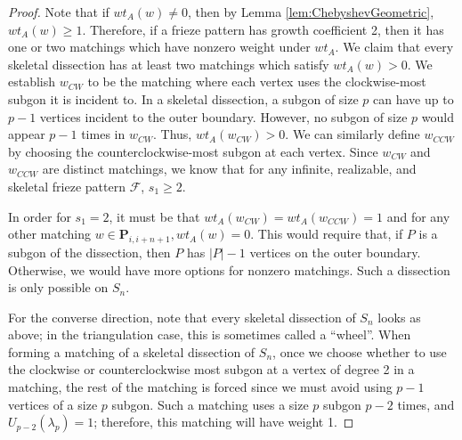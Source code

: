 \documentclass[12pt]{article}
\theoremstyle{remark}
\newcommand*{\pathset}[2]{\mathbf{P}_{#1,#2}}
\begin{document}
\begin{proof}
Note that if $wt_A(w) \neq 0$, then by Lemma \ref{lem:ChebyshevGeometric}, $wt_A(w) \geq 1$. Therefore, if a frieze pattern has growth coefficient 2, then it has one or two matchings which have nonzero weight under $wt_A$. We claim that every skeletal dissection has at least two matchings which satisfy $wt_A(w) > 0$. We establish $w_{CW}$ to be the matching where each vertex uses the clockwise-most subgon it is incident to. In a skeletal dissection, a subgon of size $p$ can have up to $p-1$ vertices incident to the outer boundary. However, no subgon of size $p$ would appear $p-1$ times in $w_{CW}$. Thus, $wt_A(w_{CW}) > 0$. We can similarly define $w_{CCW}$ by choosing the counterclockwise-most subgon at each vertex. Since $w_{CW}$ and $w_{CCW}$ are distinct matchings, we know that for any infinite, realizable, and skeletal frieze pattern $\mathcal{F}$, $s_1 \geq 2$. 

In order for $s_1 = 2$, it must be that $wt_A(w_{CW}) = wt_A(w_{CCW}) = 1$ and for any other matching $w \in \pathset{i}{i+n+1}, wt_A(w) = 0$. This would require that, if $P$ is a subgon of the dissection, then $P$ has $\vert P \vert  - 1$ vertices on the outer boundary. Otherwise, we would have more options for nonzero matchings. Such a dissection is only possible on $S_n$. 

\begin{center}
  \end{center}

For the converse direction, note that every skeletal dissection of $S_n$ looks as above; in the triangulation case, this is sometimes called a ``wheel''. When forming a matching of a skeletal dissection of $S_n$, once we choose whether to use the clockwise or counterclockwise most subgon at a vertex of degree 2 in a matching, the rest of the matching is forced since we must avoid using $p-1$ vertices of a size $p$ subgon. Such a matching uses a size $p$ subgon $p-2$ times, and $U_{p-2}(\lambda_p) = 1$; therefore, this matching will have weight 1.
\end{proof}
\end{document}
